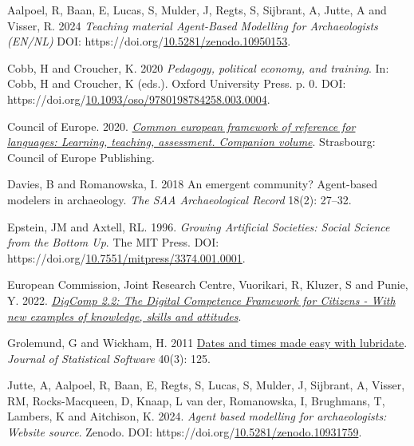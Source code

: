\documentclass[
]{article}
\newlength{\cslhangindent}
\newlength{\cslentryspacingunit} %
\newenvironment{CSLReferences}[2] %
 {%
  \setlength{\parindent}{0pt}
  \ifodd #1
  \let\oldpar\par
  \def\par{\hangindent=\cslhangindent\oldpar}
  \fi
  \setlength{\parskip}{#2\cslentryspacingunit}
 }%
 {}
\begin{document}
\hypertarget{refs}{}
\begin{CSLReferences}{1}{0}
\leavevmode{}%
Aalpoel, R, Baan, E, Lucas, S, Mulder, J, Regts, S, Sijbrant, A, Jutte, A and Visser, R. 2024 \emph{Teaching material Agent-Based Modelling for Archaeologists (EN/NL)} DOI: https://doi.org/\href{https://doi.org/10.5281/zenodo.10950153}{10.5281/zenodo.10950153}.

\leavevmode{}%
Cobb, H and Croucher, K. 2020 \emph{Pedagogy, political economy, and training}. In: Cobb, H and Croucher, K (eds.). Oxford University Press. p. 0. DOI: https://doi.org/\href{https://doi.org/10.1093/oso/9780198784258.003.0004}{10.1093/oso/9780198784258.003.0004}.

\leavevmode{}%
Council of Europe. 2020. \emph{\href{http://www.coe.int/lang-cefr}{Common european framework of reference for languages: Learning, teaching, assessment. Companion volume}}. Strasbourg: Council of Europe Publishing.

\leavevmode{}%
Davies, B and Romanowska, I. 2018 An emergent community? Agent-based modelers in archaeology. \emph{The SAA Archaeological Record} 18(2): 27--32.

\leavevmode{}%
Epstein, JM and Axtell, RL. 1996. \emph{Growing Artificial Societies: Social Science from the Bottom Up}. The MIT Press. DOI: https://doi.org/\href{https://doi.org/10.7551/mitpress/3374.001.0001}{10.7551/mitpress/3374.001.0001}.

\leavevmode{}%
European Commission, Joint Research Centre, Vuorikari, R, Kluzer, S and Punie, Y. 2022. \emph{\href{https://data.europa.eu/doi/10.2760/115376}{DigComp 2.2: The Digital Competence Framework for Citizens - With new examples of knowledge, skills and attitudes}}.

\leavevmode{}%
Grolemund, G and Wickham, H. 2011 \href{https://www.jstatsoft.org/v40/i03/}{Dates and times made easy with lubridate}. \emph{Journal of Statistical Software} 40(3): 125.

\leavevmode{}%
Jutte, A, Aalpoel, R, Baan, E, Regts, S, Lucas, S, Mulder, J, Sijbrant, A, Visser, RM, Rocks-Macqueen, D, Knaap, L van der, Romanowska, I, Brughmans, T, Lambers, K and Aitchison, K. 2024. \emph{Agent based modelling for archaeologists: Website source}. Zenodo. DOI: https://doi.org/\href{https://doi.org/10.5281/zenodo.10931759}{10.5281/zenodo.10931759}.


\end{CSLReferences}
\end{document}
